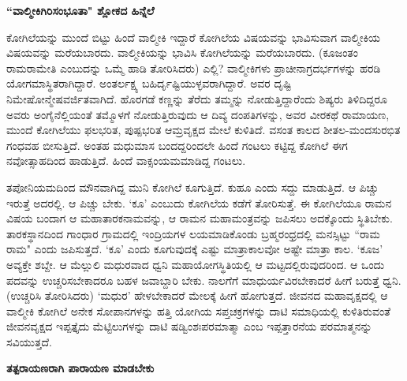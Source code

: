 {\bf ``ವಾಲ್ಮೀಕಿಗಿರಿಸಂಭೂತಾ" ಶ್ಲೋಕದ ಹಿನ್ನೆಲೆ} 


ಕೋಗಿಲೆಯನ್ನು ಮುಂದೆ ಬಿಟ್ಟು ಹಿಂದೆ ವಾಲ್ಮೀಕಿ ಇದ್ದಾರೆ ಕೋಗಿಲೆಯ ವಿಷಯವನ್ನು ಭಾವಿಸುವಾಗ ವಾಲ್ಮೀಕಿಯ ವಿಷಯವನ್ನು ಮರೆಯಬಾರದು. ವಾಲ್ಮೀಕಿಯನ್ನು ಭಾವಿಸಿ ಕೋಗಿಲೆಯನ್ನು ಮರೆಯಬಾರದು. (ಕೂಜಂತಂ ರಾಮರಾಮೇತಿ ಎಂಬುದನ್ನು ಒಮ್ಮೆ ಹಾಡಿ ತೋರಿಸಿದರು) ಎಲ್ಲಿ? ವಾಲ್ಮೀಕಿಗಳು ಪ್ರಾಚೀನಾಗ್ರದರ್ಭಗಳನ್ನು ಹರಡಿ ಯೋಗಮಾಸ್ಥಿತರಾಗಿದ್ದಾರೆ. ಅಂತರ್ಲಕ್ಷ್ಯ ಬಹಿರ್ದೃಷ್ಟಿಯುಳ್ಳವರಾಗಿದ್ದಾರೆ. ಅವರ ದೃಷ್ಟಿ ನಿಮೇಷೋನ್ಮೇಷವರ್ಜಿತವಾಗಿದೆ. ಹೊರಗಡೆ ಕಣ್ಣನ್ನು ತೆರೆದು ತಮ್ಮನ್ನು ನೋಡುತ್ತಿದ್ದಾರೆಂದು ಶಿಷ್ಯರು ತಿಳಿದಿದ್ದರೂ ಅವರು ಅಂಗೈನೆಲ್ಲಿಯಂತೆ ತಮ್ಮೊಳಗೆ ನೋಡುತ್ತಿರುವುದು ಆ ದಿವ್ಯ ದಂಪತಿಗಳನ್ನು, ಅವರ ವೀರಕಥೆ ರಾಮಾಯಣ, ಮುಂದೆ ಕೋಗಿಲೆಯು ಫಲಭರಿತ, ಪುಷ್ಪಭರಿತ ಆಮ್ರವೃಕ್ಷದ ಮೇಲೆ ಕುಳಿತಿದೆ. ವಸಂತ ಕಾಲದ ಶೀತಲ-ಮಂದಸುರಭಿತ ಗಂಧವಹ ಬೀಸುತ್ತಿದೆ. ಅಂತಹ ಮಧುಮಾಸ ಬಂದದ್ದರಿಂದಲೇ ಹಿಂದೆ ಗಂಟಲು ಕಟ್ಟಿದ್ದ ಕೋಗಿಲೆ ಈಗ ನವೋತ್ಸಾಹದಿಂದ ಹಾಡುತ್ತಿದೆ. ಹಿಂದೆ ವಾಕ್ಸಂಯಮಮಾಡಿದ್ದ ಗಂಟಲು. 

ತಪೋನಿಯಮದಿಂದ ಮೌನವಾಗಿದ್ದ ಮುನಿ ಕೋಗಿಲೆ ಕೂಗುತ್ತಿದೆ. ಕುಹೂ ಎಂದು ಸದ್ದು ಮಾಡುತ್ತಿದೆ. ಆ ಪಿಚ್ಚು ಇರುತ್ತೆ ಅದರಲ್ಲಿ. ಆ ಪಿಚ್ಚು ಬೇಕು. `ಕೂ' ಎಂಬುದು ಕೋಗಿಲೆಯ ಕಡೆಗೆ ತೋರಿಸುತ್ತೆ. ಈ ಕೋಗಿಲೆಯೂ ರಾಮನ ವಿಷಯ ಬಂದಾಗ ಆ ಮಹಾತಾರಕನಾಮವನ್ನು, ಆ ರಾಮನ ಮಹಾಮಂತ್ರವನ್ನು ಜಪಿಸಲು ಅದಕ್ಕೊಂದು ಸ್ಥಿತಿಬೇಕು. ತಾರಕಸ್ಥಾನದಿಂದ ಗಾಂಧಾರ ಗ್ರಾಮದಲ್ಲಿ ಇಂದ್ರಿಯಗಳ ಲಯಮಾಡಿಕೊಂಡು ಬ್ರಹ್ಮರಂಧ್ರದಲ್ಲಿ ಮನಸ್ಸಿಟ್ಟು ``ರಾಮ ರಾಮ" ಎಂದು ಜಪಿಸುತ್ತದೆ. `ಕೂ' ಎಂದು ಕೂಗುವುದಕ್ಕೆ ಎಷ್ಟು ಮಾತ್ರಾಕಾಲವೋ ಅಷ್ಟೇ ಮಾತ್ರಾ ಕಾಲ. `ಕೂಜ' ಅವ್ಯಕ್ತೇ ಶಬ್ದೇ. ಆ ಮೆಲ್ಲುಲಿ ಮಧುರವಾದ ಧ್ವನಿ ಮಹಾಯೋಗಸ್ಥಿತಿಯಲ್ಲಿ ಆ ಮಟ್ಟದಲ್ಲಿರುವುದರಿಂದ. ಆ ಒಂದು ಪದವನ್ನು ಉಚ್ಚರಿಸಬೇಕಾದರೂ ಬಹಳ ಜವಾಬ್ದಾರಿ ಬೇಕು. ನಾಲಗೆಗೆ ಮಾಧುರ್ಯವಿರಬೇಕಾದರೆ ಹೀಗೆ ಬರುತ್ತೆ ಧ್ವನಿ. (ಉಚ್ಚರಿಸಿ ತೋರಿಸಿದರು) `ಮಧುರ' ಹೇಳಬೇಕಾದರೆ ಮೇಲಕ್ಕೆ ಹೀಗೆ ಹೋಗುತ್ತದೆ. ಜೀವನದ ಮಹಾವೃಕ್ಷದಲ್ಲಿ ಆ ವಾಲ್ಮೀಕಿ ಕೋಗಿಲೆ ಅನೇಕ ಸೋಪಾನಗಳನ್ನು ಹತ್ತಿ ಯೋಗಿಯ ಸಪ್ತಚಕ್ರಗಳನ್ನು ದಾಟಿ ಸಮಾಧಿಯಲ್ಲಿ ಕುಳಿತಿರುವಂತೆ ಜೀವನವೃಕ್ಷದ ಇಪ್ಪತ್ತೈದು ಮೆಟ್ಟಿಲುಗಳನ್ನು ದಾಟಿ ಷಡ್ವಿಂಶಃಪರಮಾತ್ಮಾ ಎಂಬ ಇಪ್ಪತ್ತಾರನೆಯ ಪರಮಾತ್ಮನನ್ನು ಸವಿಯುತ್ತದೆ. 


{\bf ತತ್ಪರಾಯಣರಾಗಿ ಪಾರಾಯಣ ಮಾಡಬೇಕು} 


